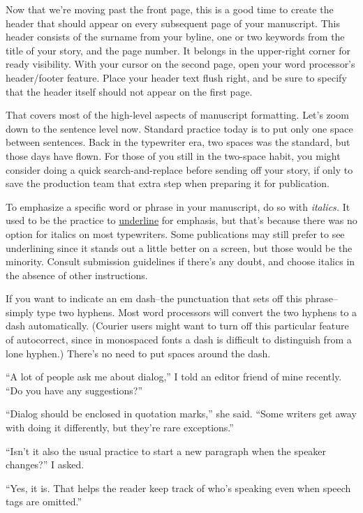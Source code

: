 \documentclass[12pt]{article}
\begin{document}
Now that we’re moving past the front page, this is a good
time to create the header that should appear on every subsequent
page of your manuscript. This header consists of the surname
from your byline, one or two keywords from the title of your
story, and the page number. It belongs in the upper-right corner
for ready visibility. With your cursor on the second page, open
your word processor’s header/footer feature. Place your header
text flush right, and be sure to specify that the header itself
should not appear on the first page.

That covers most of the high-level aspects of manuscript
formatting. Let’s zoom down to the sentence level now. Standard
practice today is to put only one space between sentences. Back
in the typewriter era, two spaces was the standard, but those
days have flown. For those of you still in the two-space habit,
you might consider doing a quick search-and-replace before
sending off your story, if only to save the production team that
extra step when preparing it for publication.

To emphasize a specific word or phrase in your manuscript,
do so with \textit{italics.} It used to be the practice to \underline{underline} for
emphasis, but that’s because there was no option for italics on
most typewriters. Some publications may still prefer to see
underlining since it stands out a little better on a screen, but
those would be the minority. Consult submission guidelines if
there’s any doubt, and choose italics in the absence of other
instructions.

If you want to indicate an em dash--the punctuation that
sets off this phrase--simply type two hyphens. Most word
processors will convert the two hyphens to a dash automatically.
(Courier users might want to turn off this particular feature of
autocorrect, since in monospaced fonts a dash is difficult to
distinguish from a lone hyphen.) There’s no need to put spaces
around the dash.

“A lot of people ask me about dialog,” I told an editor
friend of mine recently. “Do you have any suggestions?”

“Dialog should be enclosed in quotation marks,” she said.
“Some writers get away with doing it differently, but they’re
rare exceptions.”

“Isn’t it also the usual practice to start a new paragraph
when the speaker changes?” I asked.

“Yes, it is. That helps the reader keep track of who’s
speaking even when speech tags are omitted.”
\end{document}
